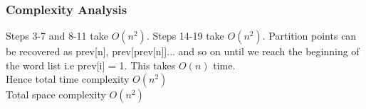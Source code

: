 \documentclass[12pt]{article}
\begin{document}
\subsubsection{Complexity Analysis}

Steps 3-7 and 8-11 take $O(n^2)$. Steps 14-19 take $O(n^2)$. Partition points can be recovered as prev[n], prev[prev[n]]... and so on until we reach the beginning of the word list i.e prev[i] = 1. This takes $O(n)$ time.\\
Hence total time complexity $O(n^2)$\\
Total space complexity $O(n^2)$
\end{document}
